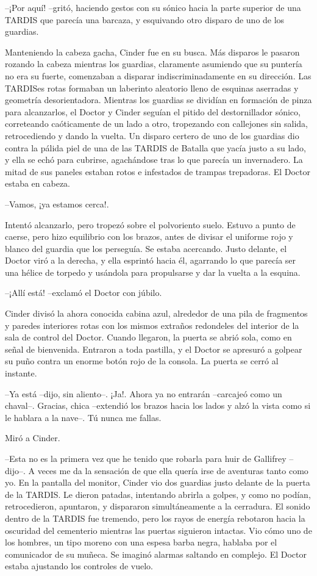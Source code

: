 --¡Por aquí! --gritó, haciendo gestos con su sónico hacia la parte superior de una TARDIS que parecía una barcaza, y esquivando otro disparo de uno de los guardias.

Manteniendo la cabeza gacha, Cinder fue en su busca. Más disparos le pasaron rozando la cabeza mientras los guardias, claramente asumiendo que su puntería no era su fuerte, comenzaban a disparar indiscriminadamente en su dirección.
Las TARDISes rotas formaban un laberinto aleatorio lleno de esquinas aserradas y geometría desorientadora.
Mientras los guardias se dividían en formación de pinza para alcanzarlos, el Doctor y Cinder seguían el pitido del destornillador sónico, correteando caóticamente de un lado a otro, tropezando con callejones sin salida, retrocediendo y dando la vuelta.
Un disparo certero de uno de los guardias dio contra la pálida piel de una de las TARDIS de Batalla que yacía justo a su lado, y ella se echó para cubrirse, agachándose tras lo que parecía un invernadero. La mitad de sus paneles estaban rotos e infestados de trampas trepadoras.
El Doctor estaba en cabeza.

--Vamos, ¡ya estamos cerca!.

Intentó alcanzarlo, pero tropezó sobre el polvoriento suelo. Estuvo a punto de caerse, pero hizo equilibrio con los brazos, antes de divisar el uniforme rojo y blanco del guardia que los perseguía. Se estaba acercando.
Justo delante, el Doctor viró a la derecha, y ella esprintó hacia él, agarrando lo que parecía ser una hélice de torpedo y usándola para propulsarse y dar la vuelta a la esquina.

--¡Allí está! --exclamó el Doctor con júbilo.

Cinder divisó la ahora conocida cabina azul, alrededor de una pila de fragmentos y paredes interiores rotas con los mismos extraños redondeles del interior de la sala de control del Doctor. Cuando llegaron, la puerta se abrió sola, como en señal de bienvenida. Entraron a toda pastilla, y el Doctor se apresuró a golpear su puño contra un enorme botón rojo de la consola. La puerta se cerró al instante.

--Ya está --dijo, sin aliento--. ¡Ja!. Ahora ya no entrarán --carcajeó como un chaval--. Gracias, chica --extendió los brazos hacia los lados y alzó la vista como si le hablara a la nave--. Tú nunca me fallas.

Miró a Cinder.

--Esta no es la primera vez que he tenido que robarla para huir de Gallifrey --dijo--. A veces me da la sensación de que ella quería irse de aventuras tanto como yo.
En la pantalla del monitor, Cinder vio dos guardias justo delante de la puerta de la TARDIS. Le dieron patadas, intentando abrirla a golpes, y como no podían, retrocedieron, apuntaron, y dispararon simultáneamente a la cerradura.
El sonido dentro de la TARDIS fue tremendo, pero los rayos de energía rebotaron hacia la oscuridad del cementerio mientras las puertas siguieron intactas. Vio cómo uno de los hombres, un tipo moreno con una espesa barba negra, hablaba por el comunicador de su muñeca.  Se imaginó alarmas saltando en complejo.
El Doctor estaba ajustando los controles de vuelo.


